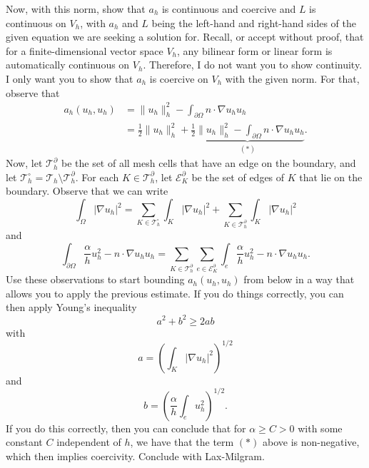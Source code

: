 \documentclass{article}
\theoremstyle{plain}
\theoremstyle{definition}
\theoremstyle{remark}
\begin{document}
\begin{enumerate}
        Now, with this norm, show that $a_h$ is continuous and coercive and $L$ is continuous on $V_h$, with $a_h$ and $L$ being the left-hand and right-hand sides of the given equation we are seeking a solution for.
        Recall, or accept without proof, that for a finite-dimensional vector space $V_h$, any bilinear form or linear form is automatically continuous on $V_h$.
        Therefore, I do not want you to show continuity.
        I only want you to show that $a_h$ is coercive on $V_h$ with the given norm.
        For that, observe that
        \begin{align*}
          a_h(u_h,u_h) & = \|u_h\|_h^2 - \int_{\partial\Omega}n\cdot\nabla u_hu_h                                                         \\
                       & = \frac{1}{2}\|u_h\|_h^2 + \underbrace{\frac{1}{2}\|u_h\|_h^2 - \int_{\partial\Omega}n\cdot\nabla u_hu_h}_{(*)}.
        \end{align*}
        Now, let $\mathcal T_h^\partial$ be the set of all mesh cells that have an edge on the boundary, and let $\mathcal T_h^\circ = \mathcal T_h\setminus\mathcal T_h^\partial$.
        For each $K \in \mathcal T_h^\partial$, let $\mathcal E_K^\partial$ be the set of edges of $K$ that lie on the boundary.
        Observe that we can write
        \[\int_\Omega|\nabla u_h|^2 = \sum_{K\in\mathcal T_h^\circ}\int_K|\nabla u_h|^2 + \sum_{K\in\mathcal T_h^\partial}\int_K|\nabla u_h|^2\]
        and
        \[\int_{\partial \Omega}\frac{\alpha}{h}u_h^2 - n\cdot\nabla u_hu_h = \sum_{K\in\mathcal T_h^\partial}\sum_{e\in\mathcal E_K^\partial}\int_e\frac{\alpha}{h}u_h^2 - n\cdot\nabla u_hu_h.\]
        Use these observations to start bounding $a_h(u_h,u_h)$ from below in a way that allows you to apply the previous estimate.
        If you do things correctly, you can then apply Young's inequality \[a^2 + b^2 \geq 2ab\] with \[a = \left(\int_K|\nabla u_h|^2\right)^{1/2}\] and \[b = \left(\frac{\alpha}{h}\int_eu_h^2\right)^{1/2}.\]
        If you do this correctly, then you can conclude that for $\alpha \geq C > 0$ with some constant $C$ independent of $h$, we have that the term $(*)$ above is non-negative, which then implies coercivity.
        Conclude with Lax-Milgram.
\end{enumerate}
\end{document}
